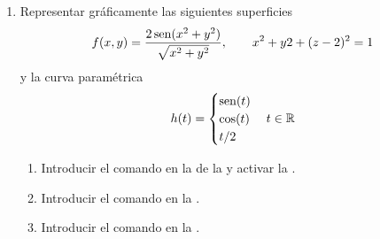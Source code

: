 \begin{enumerate}
\item Representar gráficamente las siguientes superficies
      \[
      f(x,y)=\dfrac{2\operatorname{sen}(x^2+y^2)}{\sqrt{x^2+y^2}}, \qquad x^2+y 2+(z-2)^2=1
      \]
      y la curva paramétrica
      \[
      h(t)=
      \begin{cases}
      \operatorname{sen}(t) \\
      \cos(t) \\
      t/2
      \end{cases}
      t\in \mathbb{R}
      \]
      \begin{indication}
      \begin{enumerate}
      \item Introducir el comando  en la  de la  y activar la .
      \item Introducir el comando   en la .
      \item Introducir el comando   en la .
      \end{enumerate}
      \end{indication}
\end{enumerate}